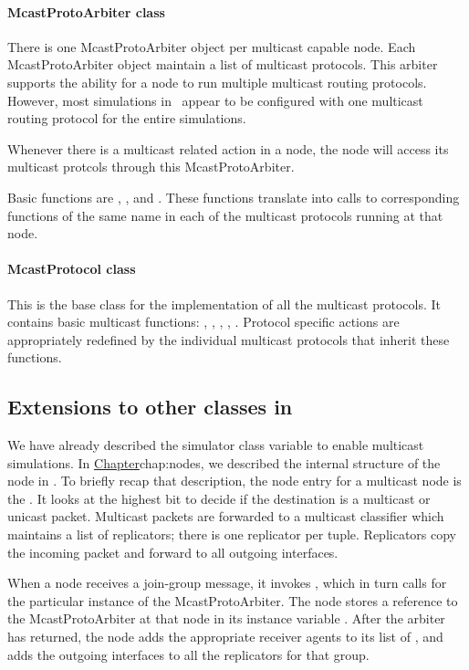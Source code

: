 {\paragraph{McastProtoArbiter class}
There is one McastProtoArbiter object per multicast capable node.
Each  McastProtoArbiter object maintain a list of multicast protocols.
This arbiter supports the ability for a node to run multiple multicast
routing protocols.
However, most simulations in \ns\ appear to be
configured with one multicast routing protocol for the entire simulations.

Whenever there is a multicast related action in a node, the
node will access its multicast protcols through this McastProtoArbiter.

Basic functions are , , and
.
These functions translate into calls to corresponding functions of the
same name in each of the multicast protocols running at that node.

\paragraph{McastProtocol class}
This is the base class for the implementation of all the multicast protocols.
It contains basic multicast functions:
, ,
, , .
Protocol specific actions are appropriately redefined
by the individual multicast protocols that inherit these functions.

\subsection{Extensions to other classes in \ns}
We have already described the simulator class variable
 to enable multicast simulations.
In 
\href{the earlier chapter describing nodes in \ns}{Chapter}{chap:nodes},
we described the internal structure of the node in \ns.
To briefly recap that description, the node entry for a multicast node is
the .  It looks at the highest bit to decide
 if the destination is a multicast or unicast packet.
 Multicast packets are forwarded to a multicast
classifier which maintains a list of replicators;
there is one replicator per  tuple.
Replicators copy the incoming packet and forward to all outgoing interfaces.

When a node receives a join-group message,
it invokes , 
which in turn calls
 for the particular instance
of the McastProtoArbiter.
The node stores a reference to the McastProtoArbiter at that node in
its instance variable .
After the arbiter has returned, the node
adds the appropriate receiver agents to its list of ,
and adds the outgoing interfaces to all the replicators for that group.

}
